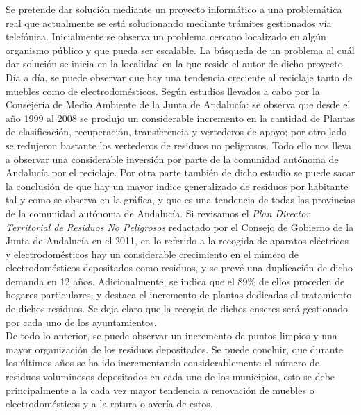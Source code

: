 Se pretende dar solución mediante un proyecto informático a una problemática real que actualmente se está solucionando mediante trámites gestionados vía telefónica. Inicialmente se observa un problema cercano localizado en algún organismo público y que pueda ser escalable. La búsqueda de un problema al cuál dar solución se inicia en la localidad en la que reside el autor de dicho proyecto. \\

Día a día, se puede observar que hay una tendencia creciente al reciclaje tanto de muebles como de electrodomésticos. Según estudios \cite{AndaluciaEcologica:web} llevados a cabo por la Consejería de Medio Ambiente de la Junta de Andalucía: se observa que desde el año 1999 al 2008 se produjo un considerable incremento en la cantidad de Plantas de clasificación, recuperación, transferencia y vertederos de apoyo; por otro lado se redujeron bastante los vertederos de residuos no peligrosos. Todo ello nos lleva a observar una considerable inversión por parte de la comunidad autónoma de Andalucía por el reciclaje. Por otra parte también de dicho estudio se puede sacar la conclusión de que hay un mayor indice generalizado de residuos por habitante tal y como se observa en la gráfica, y que es una tendencia de todas las provincias de la comunidad autónoma de Andalucía. Si revisamos el \textit{Plan Director Territorial de Residuos No Peligrosos}\cite{conserjeria_de_medio_ambiente_junta_de_andalucia_plan_2011} redactado por el Consejo de Gobierno de la Junta de Andalucía en el 2011, en lo referido a la recogida de aparatos eléctricos y electrodomésticos hay un considerable crecimiento en el número de electrodomésticos depositados como residuos, y se prevé una duplicación de dicho demanda en 12 años. Adicionalmente, se indica que el 89\% de ellos proceden de hogares particulares, y destaca el incremento de plantas dedicadas al tratamiento de dichos residuos. Se deja claro que la recogía de dichos enseres será gestionado por cada uno de los ayuntamientos. \\

De todo lo anterior, se puede observar un incremento de puntos limpios y una mayor organización de los residuos depositados. Se puede concluir, que durante los últimos años se ha ido incrementando considerablemente el número de residuos voluminosos depositados en cada uno de los municipios, esto se debe principalmente a la cada vez mayor tendencia a renovación de muebles o electrodomésticos y a la rotura o avería de estos. \\

